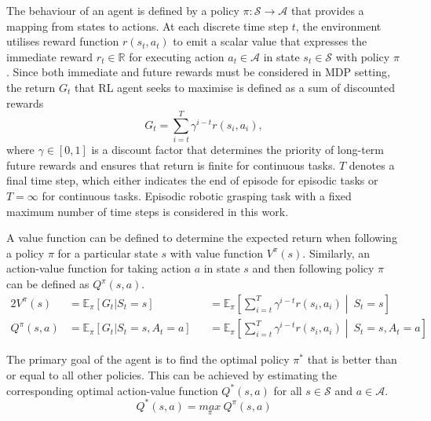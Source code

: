 The behaviour of an agent is defined by a policy \(\pi : \mathcal{S} \rightarrow \mathcal{A}\) that provides a mapping from states to actions. At each discrete time step \(t\), the environment utilises reward function \(r(s_{t}, a_{t})\) to emit a scalar value that expresses the immediate reward \(r_{t} \in \mathbb{R}\) for executing action \(a_{t} \in \mathcal{A}\) in state \(s_{t} \in \mathcal{S}\) with policy \(\pi\). Since both immediate and future rewards must be considered in MDP setting, the return \(G_{t}\) that RL agent seeks to maximise is defined as a sum of discounted rewards
\begin{equation}
    G_{t} = \sum\limits_{i=t}^T \gamma^{i-t} r(s_{i}, a_{i}),
\end{equation}
where \(\gamma \in [0, 1]\) is a discount factor that determines the priority of long-term future rewards and ensures that return is finite for continuous tasks. \(T\) denotes a final time step, which either indicates the end of episode for episodic tasks or \(T=\infty\) for continuous tasks. Episodic robotic grasping task with a fixed maximum number of time steps is considered in this work.

A value function can be defined to determine the expected return when following a policy \(\pi\) for a particular state \(s\) with value function \(V^{\pi}(s)\). Similarly, an action-value function for taking action \(a\) in state \(s\) and then following policy \(\pi\) can be defined as \(Q^{\pi}(s, a)\).
\begin{alignat}{2}
    V^{\pi}(s)    & = \mathbb{E}_{\pi} [G_{t} \vert S_{t}{=}s]            &  & = \mathbb{E}_{\pi} \left[ \sum\limits_{i=t}^T \gamma^{i-t} r(s_{i}, a_{i}) \middle\vert\ S_{t}{=}s \right]            \\
    Q^{\pi}(s, a) & = \mathbb{E}_{\pi} [G_{t} \vert S_{t}{=}s, A_{t}{=}a] &  & = \mathbb{E}_{\pi} \left[ \sum\limits_{i=t}^T \gamma^{i-t} r(s_{i}, a_{i}) \middle\vert\ S_{t}{=}s, A_{t}{=}a \right]
\end{alignat}

The primary goal of the agent is to find the optimal policy \(\pi^{*}\) that is better than or equal to all other policies. This can be achieved by estimating the corresponding optimal action-value function \(Q^{*}(s, a)\) for all \(s \in \mathcal{S}\) and \(a \in \mathcal{A}\).
\begin{equation}
    Q^{*}(s, a) = \underset{\pi}{max}\ Q^{\pi}(s, a)
    \label{eq:optimal_action_value_function}
\end{equation}

